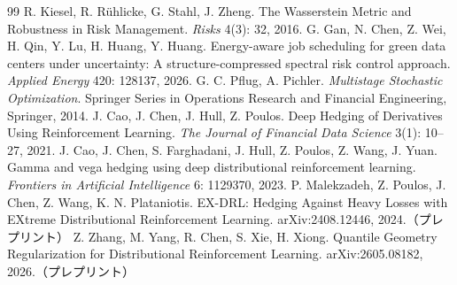 \documentclass[a4paper,10pt]{jsarticle}
\theoremstyle{definition}
\begin{document}
\begin{thebibliography}{99}
 R. Kiesel, R. R{\"u}hlicke, G. Stahl, J. Zheng.
The Wasserstein Metric and Robustness in Risk Management. \textit{Risks} 4(3): 32, 2016.
 G. Gan, N. Chen, Z. Wei, H. Qin, Y. Lu, H. Huang, Y. Huang.
Energy-aware job scheduling for green data centers under uncertainty: A structure-compressed spectral risk control approach. \textit{Applied Energy} 420: 128137, 2026.
 G. C. Pflug, A. Pichler.
\textit{Multistage Stochastic Optimization}. Springer Series in Operations Research and Financial Engineering, Springer, 2014.
 J. Cao, J. Chen, J. Hull, Z. Poulos.
Deep Hedging of Derivatives Using Reinforcement Learning. \textit{The Journal of Financial Data Science} 3(1): 10--27, 2021.
 J. Cao, J. Chen, S. Farghadani, J. Hull, Z. Poulos, Z. Wang, J. Yuan.
Gamma and vega hedging using deep distributional reinforcement learning. \textit{Frontiers in Artificial Intelligence} 6: 1129370, 2023.
 P. Malekzadeh, Z. Poulos, J. Chen, Z. Wang, K. N. Plataniotis.
EX-DRL: Hedging Against Heavy Losses with EXtreme Distributional Reinforcement Learning. arXiv:2408.12446, 2024.（プレプリント）
 Z. Zhang, M. Yang, R. Chen, S. Xie, H. Xiong.
Quantile Geometry Regularization for Distributional Reinforcement Learning. arXiv:2605.08182, 2026.（プレプリント）
\end{thebibliography}
\end{document}
